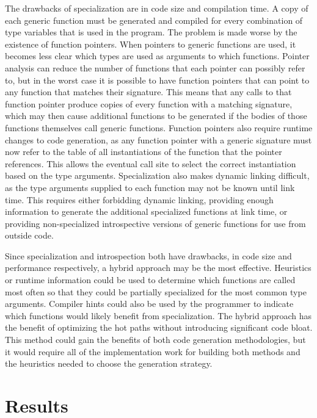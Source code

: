 \documentclass[letterpaper,twocolumn,11pt]{article}
\begin{document}
The drawbacks of specialization are in code size and compilation time. A copy of each generic function must be generated and compiled for every combination of type variables that is used in the program. The problem is made worse by the existence of function pointers. When pointers to generic functions are used, it becomes less clear which types are used as arguments to which functions. Pointer analysis can reduce the number of functions that each pointer can possibly refer to, but in the worst case it is possible to have function pointers that can point to any function that matches their signature. This means that any calls to that function pointer produce copies of every function with a matching signature, which may then cause additional functions to be generated if the bodies of those functions themselves call generic functions. Function pointers also require runtime changes to code generation, as any function pointer with a generic signature must now refer to the table of all instantiations of the function that the pointer references. This allows the eventual call site to select the correct instantiation based on the type arguments. Specialization also makes dynamic linking difficult, as the type arguments supplied to each function may not be known until link time. This requires either forbidding dynamic linking, providing enough information to generate the additional specialized functions at link time, or providing non-specialized introspective versions of generic functions for use from outside code. 

Since specialization and introspection both have drawbacks, in code size and performance respectively, a hybrid approach may be the most effective. Heuristics or runtime information could be used to determine which functions are called most often so that they could be partially specialized for the most common type arguments. Compiler hints could also be used by the programmer to indicate which functions would likely benefit from specialization. The hybrid approach has the benefit of optimizing the hot paths without introducing significant code bloat. This method could gain the benefits of both code generation methodologies, but it would require all of the implementation work for building both methods and the heuristics needed to choose the generation strategy.

\section{Results} \label{results}
\end{document}

